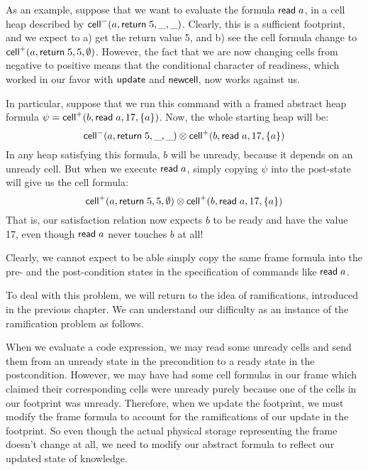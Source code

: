As an example, suppose that we want to evaluate the formula $\mathsf{read}\;
a$, in a cell heap described by $\mathsf{cell}^{-}({a}, {\mathsf{return}\; 5}, {\_}, {\_})$.  Clearly,
this is a sufficient footprint, and we expect to a) get the return
value 5, and b) see the cell formula change to $\mathsf{cell}^{+}({a}, {\mathsf{return}\;
  5}, {5}, {\emptyset})$.  However, the fact that we are now changing cells
from negative to positive means that the conditional character of
readiness, which worked in our favor with $\mathsf{update}$ and
$\mathsf{newcell}\;\!\!$, now works against us.

In particular, suppose that we run this command with a framed abstract heap
formula $\psi = \mathsf{cell}^{+}({b}, {\mathsf{read}\; a}, {17}, {\{{a}\}})$. Now, the
whole starting heap will be:
\begin{displaymath}
\mathsf{cell}^{-}({a}, {\mathsf{return}\; 5}, {\_}, {\_}) \otimes \mathsf{cell}^{+}({b}, {\mathsf{read}\; a}, {17}, {\{{a}\}})  
\end{displaymath}
In any heap satisfying this formula, $b$ will be unready, because it depends 
on an unready cell. But when we execute $\mathsf{read}\; a$, simply copying $\psi$ 
into the post-state will give us the cell formula:
\begin{displaymath}
\mathsf{cell}^{+}({a}, {\mathsf{return}\; 5}, {5}, {\emptyset}) \otimes \mathsf{cell}^{+}({b}, {\mathsf{read}\; a}, {17}, {\{{a}\}})
\end{displaymath}
That is, our satisfaction relation now expects $b$ to be ready and have the 
value 17, even though $\mathsf{read}\; a$ never touches $b$ at all!

Clearly, we cannot expect to be able simply copy the same frame formula into 
the pre- and the post-condition states in the specification of commands like 
$\mathsf{read}\; a$. 

To deal with this problem, we will return to the idea of
ramifications, introduced in the previous chapter. We can understand
our difficulty as an instance of the ramification problem as
follows. 

When we evaluate a code expression, we may read some unready cells and
send them from an unready state in the precondition to a ready state
in the postcondition. However, we may have had some cell formulas in
our frame which claimed their corresponding cells were unready purely
because one of the cells in our footprint was unready. Therefore, when
we update the footprint, we must modify the frame formula to account
for the ramifications of our update in the footprint. So even though
the actual physical storage representing the frame doesn't change at
all, we need to modify our abstract formula to reflect our updated
state of knowledge.

